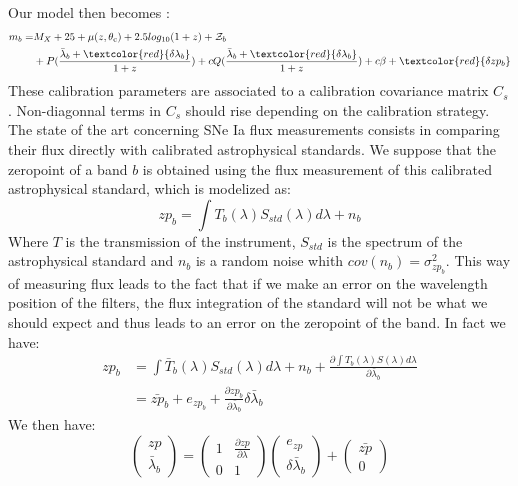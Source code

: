 \documentclass[\docopts]{\docclass}
\begin{document}
Our model then becomes :
\begin{equation}
\begin{split}
m_b = & M_X + 25 + \mu(z, \theta_\text{c}) + 2.5log_{10}(1+z) + \mathcal{Z}_b \\
&+ P(\frac{\bar\lambda_b  + \textcolor{red}{\delta\lambda_b}}{1+z}) + cQ(\frac{\bar\lambda_b  + \textcolor{red}{\delta\lambda_b}}{1+z}) + {c\beta} + \textcolor{red}{\delta zp_b}
\end{split}
\end{equation}
These calibration parameters are associated to a calibration covariance matrix $C_s$.
Non-diagonnal terms in $C_s$ should rise depending on the calibration strategy.
The state of the art concerning SNe Ia flux measurements consists in comparing their flux directly with calibrated astrophysical standards.
We suppose that the zeropoint of a band $b$ is obtained using the flux measurement of this calibrated astrophysical standard, which is modelized as:
\begin{equation}
zp_b = \int T_b(\lambda) S_{std}(\lambda) d\lambda + n_b
\end{equation}
Where $T$ is the transmission of the instrument, $S_{std}$ is the spectrum of the astrophysical standard and $n_b$ is a random noise whith $cov(n_b) = \sigma_{zp_b}^2$.
This way of measuring flux leads to the fact that if we make an error on the wavelength position of the filters, the flux integration of the standard will not be what we should expect and thus leads to an error on the zeropoint of the band.
In fact we have:
\begin{equation}
\begin{split}
zp_b &= \int \bar T_b(\lambda) S_{std}(\lambda) d\lambda + n_b + \frac{\partial \int{T_b(\lambda)S(\lambda)d\lambda}}{\partial \bar\lambda_b }\\
&= \bar{zp}_b + e_{zp_b} + \frac{\partial zp_b}{\partial \bar\lambda_b }\delta\bar\lambda_b 
\end{split}
\end{equation}
We then have:
\begin{equation}
\begin{pmatrix}
  zp \\
  \bar\lambda_b 
\end{pmatrix}
=
\begin{pmatrix}
  1 & \frac{\partial zp}{\partial \lambda} \\
  0 & 1
\end{pmatrix}
\begin{pmatrix}
  e_{zp} \\
  \delta\bar\lambda_b 
\end{pmatrix}
+
\begin{pmatrix}
  \bar{zp} \\
  0
\end{pmatrix}
\end{equation}
\end{document}
